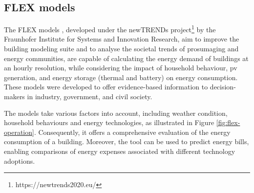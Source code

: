 \subsection{FLEX models}

The FLEX models \cite{newtrends}, developed under the newTRENDs project\footnote{https://newtrends2020.eu/} by the Fraunhofer Institute for Systems and Innovation Research, 
aim to improve the building modeling suite and to analyse the societal trends of prosumaging and energy communities, 
are capable of calculating the energy demand of buildings at an hourly resolution,
while considering the impact of household behaviour, \gls{pv} generation, and energy storage (thermal and battery) on energy consumption. 
These models were developed to offer evidence-based information to decision-makers in industry, government, and civil society. 

The models take various factors into account, including weather condition, household behaviours and energy technologies, as illustrated in Figure \ref{fig:flex-operation}.
Consequently, it offers a comprehensive evaluation of the energy consumption of a building. 
Moreover, the tool can be used to predict energy bills, enabling comparisons of energy expenses associated with different technology adoptions. 



